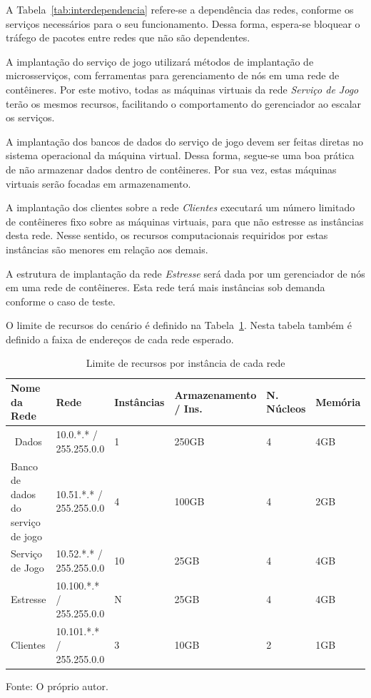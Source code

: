 A Tabela~\ref{tab:interdependencia} refere-se a dependência das redes, conforme os serviços necessários para o seu funcionamento.
%
Dessa forma, espera-se bloquear o tráfego de pacotes entre redes que não são dependentes.

A implantação do serviço de jogo utilizará métodos de implantação de microsserviços, com ferramentas para gerenciamento de nós em uma rede de contêineres.
%
Por este motivo, todas as máquinas virtuais da rede \textit{Serviço de Jogo} terão os mesmos recursos, facilitando o comportamento do gerenciador ao escalar os serviços.

A implantação dos bancos de dados do serviço de jogo devem ser feitas diretas no sistema operacional da máquina virtual.
%
Dessa forma, segue-se uma boa prática de não armazenar dados dentro de contêineres.
%
Por sua vez, estas máquinas virtuais serão focadas em armazenamento.

A implantação dos clientes sobre a rede \textit{Clientes} executará um número limitado de contêineres fixo sobre as máquinas virtuais, para que não estresse as instâncias desta rede.
%
Nesse sentido, os recursos computacionais requiridos por estas instâncias são menores em relação aos demais.

A estrutura de implantação da rede \textit{Estresse} será dada por um gerenciador de nós em uma rede de contêineres.
%
Esta rede terá mais instâncias sob demanda conforme o caso de teste.

O limite de recursos do cenário é definido na Tabela~\ref{tab:limite_recursos}.
%
Nesta tabela também é definido a faixa de endereços de cada rede esperado.

\begin{table}[htb!]
\centering
\begin{adjustbox}{max width=\textwidth}
\caption{Limite de recursos por instância de cada rede}
\label{tab:limite_recursos}
\begin{tabular}{|l|l|l|l|l|l|}
\hline
Nome da Rede                      & Rede                     & Instâncias & Armazenamento / Ins. & N. Núcleos & Memória \\ \hline
\multicolumn{1}{|c|}{Dados}       & 10.0.*.* / 255.255.0.0   & 1          & 250GB                & 4          & 4GB     \\ \hline
Banco de dados do serviço de jogo & 10.51.*.* / 255.255.0.0  & 4          & 100GB                & 4          & 2GB     \\ \hline
Serviço de Jogo                   & 10.52.*.* / 255.255.0.0  & 10         & 25GB                 & 4          & 4GB     \\ \hline
Estresse                          & 10.100.*.* / 255.255.0.0 & N          & 25GB                 & 4          & 4GB     \\ \hline
Clientes                          & 10.101.*.* / 255.255.0.0 & 3          & 10GB                 & 2          & 1GB     \\ \hline
\end{tabular}
\end{adjustbox}

Fonte: O próprio autor.
\end{table}

